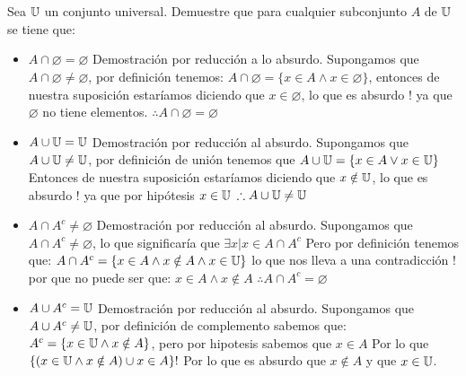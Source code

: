 \section{}
Sea $\mathbb{U}$ un conjunto universal. Demuestre que para cualquier subconjunto $A$ de $\mathbb{U}$ se tiene que:
\begin{itemize}
	\item $A \cap \varnothing = \varnothing$\newline
	Demostración por reducción a lo absurdo.\newline
	Supongamos que $A \cap \varnothing \neq \varnothing$, por definición tenemos:\newline
 	$A \cap \varnothing = \{ x \in A \wedge x \in \varnothing \}$, entonces de nuestra suposición estaríamos diciendo que $x \in \varnothing$, lo que es absurdo $!$ ya 		que $\varnothing$ no tiene elementos.\newline
	$\therefore A \cap \varnothing = \varnothing$
	
	\item $A \cup \mathbb{U} = \mathbb{U}$\newline
	Demostración por reducción al absurdo.\newline
	Supongamos que $A \cup \mathbb{U} \neq \mathbb{U}$, por definición de unión tenemos que $A \cup \mathbb{U} = \{ x \in A \lor x \in \mathbb{U}\}$\newline
	Entonces de nuestra suposición estaríamos diciendo que $x \notin \mathbb{U}$, lo que es absurdo $!$ ya que por hipótesis $x \in \mathbb{U}$\newline
	$\therefore A \cup \mathbb{U} \neq \mathbb{U}$

	\item $A \cap A^c \neq \varnothing$\newline
	Demostración por reducción al absurdo. \newline
	Supongamos que $A \cap A^c \neq \varnothing$, lo que significaría que $\exists x | x \in A \cap A^c$\newline
	Pero por definición tenemos que:\newline
	$A \cap A^c = \{ x \in A \wedge x \notin A \wedge x \in \mathbb{U} \}$\newline
	 lo que nos lleva a una contradicción $!$ por que no puede ser que:\newline
	 $x \in A \wedge x \notin A$\newline
	$\therefore A \cap A^c = \varnothing$
	
	\item $A \cup A^c = \mathbb{U}$\newline
	Demostración por reducción al absurdo.\newline
	Supongamos que $A \cup A^c \neq \mathbb{U}$, por definición de complemento sabemos que:\newline
	$A^c = \{ x \in \mathbb{U} \wedge x \notin A \}$, pero por hipotesis sabemos que $x \in A$\newline
	Por lo que $\{( x \in \mathbb{U} \wedge x \notin A) \cup x \in A \}!$ Por lo que es absurdo que $x \notin A$ y que $x \in \mathbb{U}$.
	
\end{itemize}
 